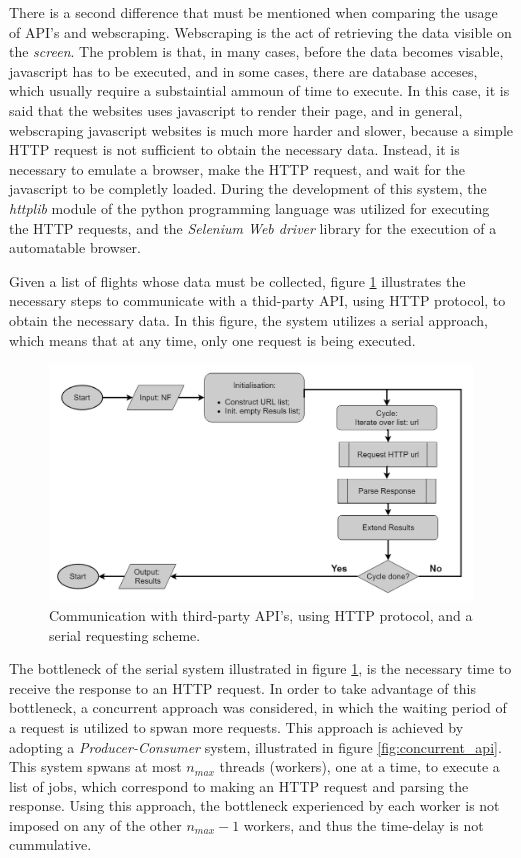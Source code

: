 There is a second difference that must be mentioned when comparing the usage of API's and webscraping.
Webscraping is the act of retrieving the data visible on the \textit{screen}.
The problem is that, in many cases, before the data becomes visable, 
javascript has to be executed, and in some cases, there are database acceses,
which usually require a substaintial ammoun of time to execute.
In this case, it is said that the websites uses javascript to render their page, and
in general, webscraping javascript websites is much more harder
and slower, because a simple HTTP request is not sufficient to obtain the necessary data.
Instead, it is necessary to emulate a browser,
make the HTTP request, and wait for the javascript to be completly loaded.
During the development of this system, the \textit{httplib} module of the python programming language
was utilized for executing the HTTP requests,
and the \textit{Selenium Web driver} library for the execution of a automatable browser.

Given a list of flights whose data must be collected,
figure \ref{fig:serial_api} illustrates the necessary steps to communicate 
with a thid-party API, using HTTP protocol, to obtain the necessary data.
In this figure, the system utilizes a serial approach, which means that at any time,
only one request is being executed. 

\begin{figure}[htpb]
  \centering
  \includegraphics[width=\textwidth]{./Figures/system_implementation/serial_api.png}
  \caption{Communication with third-party API's, using HTTP protocol, and a serial requesting scheme.}
  \label{fig:serial_api}  
\end{figure}

The bottleneck of the serial system illustrated in figure \ref{fig:serial_api},
is the necessary time to receive the response to an HTTP request.
In order to take advantage of this bottleneck, a concurrent approach was considered,
in which the waiting period of a request is utilized to spwan more requests.
This approach is achieved by adopting a \textit{Producer-Consumer} system,
illustrated in figure \ref{fig:concurrent_api}. This system 
spwans at most $n_{max}$ threads (workers),
one at a time, to execute a list of jobs, which correspond 
to making an HTTP request and parsing the response.
Using this approach, the bottleneck experienced by each worker 
is not imposed on any of the other $n_{max} -1$ workers,
and thus the time-delay is not cummulative.


